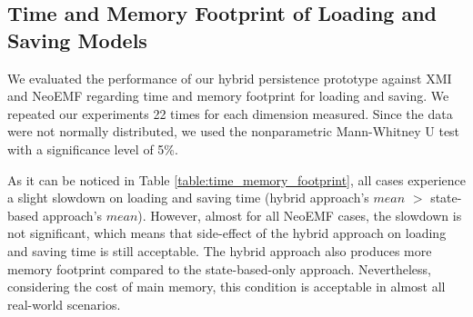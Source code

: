 \vspace{-25pt}
\subsection{Time and Memory Footprint of Loading and Saving Models}
\label{sec:model_loading_time}

\vspace{-10pt}
We evaluated the performance of our hybrid persistence prototype against XMI and NeoEMF regarding time and memory footprint for loading and saving. We repeated our experiments 22 times for each dimension measured. Since the data were not normally distributed, we used the nonparametric Mann-Whitney U test \cite{doi:10.1002/9780470479216.corpsy0524} with a significance level of 5\%. 

As it can be noticed in Table \ref{table:time_memory_footprint}, all cases experience a slight slowdown on loading and saving time (hybrid approach's $mean$ $>$ state-based approach's $mean$). However, almost for all NeoEMF cases, the slowdown is not significant, which means that side-effect of the hybrid approach on loading and saving time is still acceptable. The hybrid approach also produces more memory footprint compared to the state-based-only approach. Nevertheless, considering the cost of main memory, this condition is acceptable in almost all real-world scenarios.




